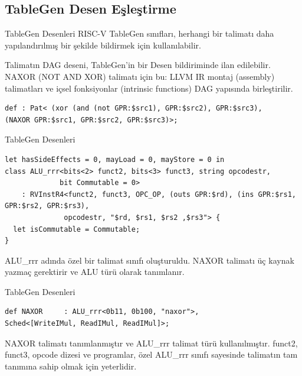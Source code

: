 \subsection{TableGen Desen Eşleştirme}
\begin{frame}[fragile]{TableGen Desenleri}
RISC-V TableGen sınıfları, herhangi bir talimatı daha yapılandırılmış bir şekilde bildirmek için kullanılabilir.
\par
Talimatın DAG deseni, TableGen'in bir Desen bildiriminde ilan edilebilir. NAXOR (NOT AND XOR) talimatı için bu: LLVM IR montaj (assembly) talimatları ve içsel fonksiyonlar (intrinsic functions) DAG yapısında birleştirilir.

\begin{lstlisting}
def : Pat< (xor (and (not GPR:$src1), GPR:$src2), GPR:$src3),
(NAXOR GPR:$src1, GPR:$src2, GPR:$src3)>;
\end{lstlisting}
\end{frame}

        

\begin{frame}[fragile]{TableGen Desenleri}
\begin{lstlisting}
let hasSideEffects = 0, mayLoad = 0, mayStore = 0 in
class ALU_rrr<bits<2> funct2, bits<3> funct3, string opcodestr,
             bit Commutable = 0>
    : RVInstR4<funct2, funct3, OPC_OP, (outs GPR:$rd), (ins GPR:$rs1, GPR:$rs2, GPR:$rs3),
              opcodestr, "$rd, $rs1, $rs2 ,$rs3"> {
  let isCommutable = Commutable;
}
\end{lstlisting}
ALU\_rrr adında özel bir talimat sınıfı oluşturuldu. NAXOR talimatı üç kaynak yazmaç gerektirir ve ALU türü olarak tanımlanır. 
\end{frame}


        
\begin{frame}[fragile]{TableGen Desenleri}
\begin{lstlisting}
def NAXOR     : ALU_rrr<0b11, 0b100, "naxor">,
Sched<[WriteIMul, ReadIMul, ReadIMul]>;
\end{lstlisting}
NAXOR talimatı tanımlanmıştır ve ALU\_rrr talimat türü kullanılmıştır. funct2, funct3, opcode dizesi ve programlar, özel ALU\_rrr sınıfı sayesinde talimatın tam tanımına sahip olmak için yeterlidir.
\end{frame}



